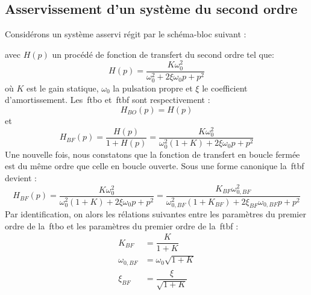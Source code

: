 \subsection{Asservissement d'un système du second ordre}

Considérons un système asservi régit par le schéma-bloc suivant :
\begin{center}
\end{center}
avec $H(p)$ un procédé de fonction de transfert du second ordre tel que:
$$
H(p)=\dfrac{K\omega^2_0}{\omega^2_0+2\xi\omega_0p+p^2}
$$
où $K$ est le gain statique, $\omega_0$ la pulsation propre et $\xi$ 
le coefficient d'amortissement.
Les~\gls{ftbo} et~\gls{ftbf} sont respectivement :
$$
H_{BO}(p)=H(p)
$$
et 
$$
H_{BF}(p)=\dfrac{H(p)}{1+H(p)}=\dfrac{K\omega^2_0}{\omega^2_0(1+K)+2\xi\omega_0p+p^2}
$$
Une nouvelle fois, nous constatons que la fonction de transfert en boucle fermée est du même ordre
que celle en boucle ouverte. Sous une forme canonique la~\gls{ftbf} devient :
$$
H_{BF}(p)=\dfrac{K\omega^2_0}{\omega^2_0(1+K)+2\xi\omega_0p+p^2}=
\dfrac{K_{BF}\omega^2_{0,BF}}{\omega^2_{0,BF}(1+K_{BF})+2\xi_{BF}\omega_{0,BF}p+p^2}
$$
Par identification, on alors les rélations suivantes entre les paramètres du premier ordre 
de la~\gls{ftbo} et les paramètres du premier ordre de la~\gls{ftbf} :
\begin{align*}
       K_{BF}&=\dfrac{K}{1+K}\\
    \omega_{0,BF}&=\omega_0\sqrt{1+K}\\
    \xi_{BF}&=\dfrac{\xi}{\sqrt{1+K}}
\end{align*}

